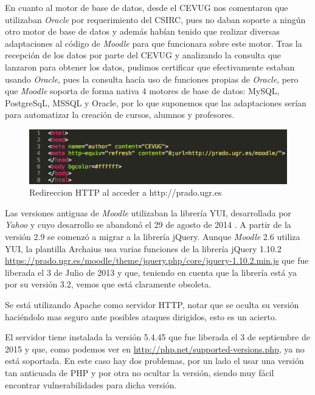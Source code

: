 \bigskip
En cuanto al motor de base de datos, desde el CEVUG nos comentaron que utilizaban \textit{Oracle} por requerimiento del CSIRC, pues no daban soporte a ningún otro motor de base de datos y además habían tenido que realizar diversas adaptaciones al código de \textit{Moodle} para que funcionara sobre este motor. Tras la recepción de los datos por parte del CEVUG y analizando la consulta que lanzaron para obtener los datos, pudimos certificar que efectivamente estaban usando \textit{Oracle}, pues la consulta hacía uso de funciones propias de \textit{Oracle}, pero que \textit{Moodle} soporta de forma nativa 4 motores de base de datos: MySQL, PostgreSqL, MSSQL y Oracle, por lo que suponemos que las adaptaciones serían para automatizar la creación de cursos, alumnos y profesores.  


\begin{figure}
\centering
\includegraphics[width=1.0\textwidth]{../screenshots/redireccionhttp}
\caption{Redireccion HTTP al acceder a http://prado.ugr.es}
\label{redireccionhttp}
\end{figure}

\bigskip
Las versiones antiguas de \textit{Moodle} utilizaban la librería YUI, desarrollada por \textit{Yahoo} y cuyo desarrollo se abandonó el 29 de agosto de 2014 \cite{art_01}. A partir de la versión 2.9 se comenzó a migrar a la librería jQuery. Aunque \textit{Moodle} 2.6 utiliza YUI, la plantilla Archaius usa varias funciones de la librería jQuery 1.10.2 \url{https://prado.ugr.es/moodle/theme/jquery.php/core/jquery-1.10.2.min.js} que fue liberada el 3 de Julio de 2013 y que, teniendo en cuenta que la librería está ya por su versión 3.2, vemos que está claramente obsoleta.

\bigskip
Se está utilizando Apache como servidor HTTP, notar que se oculta su versión haciéndolo mas seguro ante posibles ataques dirigidos, esto es un acierto.

\bigskip
El servidor tiene instalada la versión 5.4.45 que fue liberada el 3 de septiembre de 2015 y que, como podemos ver en \url{http://php.net/supported-versions.php}, ya no está soportada. En este caso hay dos problemas, por un lado el usar una versión tan anticuada de PHP y por otra no ocultar la versión, siendo muy fácil encontrar vulnerabilidades para dicha versión.

